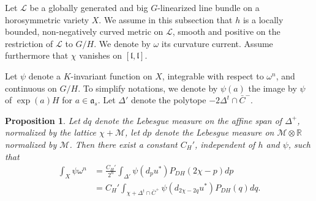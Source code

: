 \documentclass{amsart}
\newtheorem{prop}[thm]{Proposition}
\theoremstyle{definition}
\begin{document}
Let $\mathcal{L}$ be a globally generated and big 
$G$-linearized line bundle on a 
horosymmetric variety $X$. 
We assume in this subsection that $h$ is a locally bounded, 
non-negatively curved metric on $\mathcal{L}$, 
smooth and positive on the restriction of $\mathcal{L}$ to $G/H$. 
We denote by $\omega$ its curvature current. 
Assume furthermore that $\chi$ vanishes on $[\mathfrak{l},\mathfrak{l}]$. 

Let $\psi$ denote a $K$-invariant function on $X$,  
integrable with respect to $\omega^n$, 
and continuous on $G/H$. 
To simplify notations, we denote by $\psi(a)$ the image by $\psi$ 
of $\exp(a)H$ for $a\in \mathfrak{a}_s$. 
Let $\Delta'$ denote the polytope $-2\Delta^t\cap \bar{C}^-$.

\begin{prop}
\label{prop_inthoro}
Let $dq$ denote the Lebesgue measure on the affine span of $\Delta^+$,
normalized by the lattice $\chi+\mathcal{M}$, let $dp$ denote 
the Lebesgue measure on $\mathcal{M}\otimes \mathbb{R}$ normalized by 
$\mathcal{M}$. Then there exist a constant 
$C_H'$, independent of $h$ and $\psi$, such that 
\begin{align*}
\int_X\psi\omega^n & =\frac{C_H'}{2^n}\int_{\Delta'} \psi(d_pu^*)
P_{DH}(2\chi-p) dp
\\ & = 
C_H'\int_{\chi+\Delta^t\cap \bar{C}^+} \psi(d_{2\chi-2q}u^*)
P_{DH}(q) dq. 
\end{align*}
\end{prop} 
\end{document}
